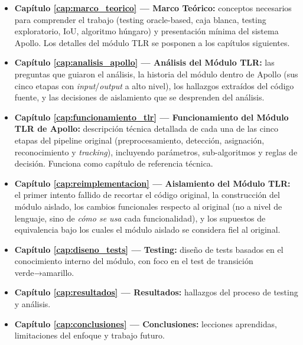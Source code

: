 \begin{itemize}
    \item \textbf{Capítulo \ref{cap:marco_teorico} --- Marco Teórico:} conceptos necesarios para comprender el trabajo (testing oracle-based, caja blanca, testing exploratorio, IoU, algoritmo húngaro) y presentación mínima del sistema Apollo. Los detalles del módulo TLR se posponen a los capítulos siguientes.

    \item \textbf{Capítulo \ref{cap:analisis_apollo} --- Análisis del Módulo TLR:} las preguntas que guiaron el análisis, la historia del módulo dentro de Apollo (sus cinco etapas con \textit{input}/\textit{output} a alto nivel), los hallazgos extraídos del código fuente, y las decisiones de aislamiento que se desprenden del análisis.

    \item \textbf{Capítulo \ref{cap:funcionamiento_tlr} --- Funcionamiento del Módulo TLR de Apollo:} descripción técnica detallada de cada una de las cinco etapas del pipeline original (preprocesamiento, detección, asignación, reconocimiento y \textit{tracking}), incluyendo parámetros, sub-algoritmos y reglas de decisión. Funciona como capítulo de referencia técnica.

    \item \textbf{Capítulo \ref{cap:reimplementacion} --- Aislamiento del Módulo TLR:} el primer intento fallido de recortar el código original, la construcción del módulo aislado, los cambios funcionales respecto al original (no a nivel de lenguaje, sino de \textit{cómo se usa} cada funcionalidad), y los supuestos de equivalencia bajo los cuales el módulo aislado se considera fiel al original.

    \item \textbf{Capítulo \ref{cap:diseno_tests} --- Testing:} diseño de tests basados en el conocimiento interno del módulo, con foco en el test de transición verde→amarillo.

    \item \textbf{Capítulo \ref{cap:resultados} --- Resultados:} hallazgos del proceso de testing y análisis.

    \item \textbf{Capítulo \ref{cap:conclusiones} --- Conclusiones:} lecciones aprendidas, limitaciones del enfoque y trabajo futuro.
\end{itemize}